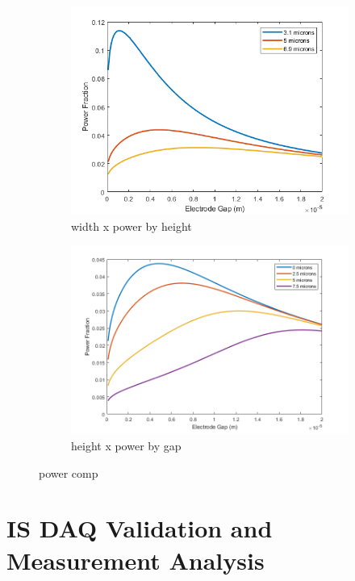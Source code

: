 \begin{figure}[h]
\begin{subfigure}[b]{0.49\textwidth}
        \centering
        \includegraphics[width=\textwidth]{images/analytic_vertical_power_width20.png}
        \caption{width x power by height}
    \end{subfigure}
    \hfill
    \begin{subfigure}[b]{0.49\textwidth}
        \centering
        \includegraphics[width=\textwidth]{images/analytic_horizontal_power_20width.png}
        \caption{height x power by gap}
    \end{subfigure}
    \caption[power comp]{power comp}
    \label{fig:analytic_sensitivity}
\end{figure}

\FloatBarrier

\section{IS DAQ Validation and Measurement Analysis}

